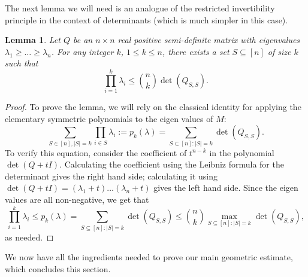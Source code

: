 \documentclass[12pt]{article}
\newtheorem{lemma}{Lemma}
\begin{document}
The next lemma we will need is an analogue of the restricted invertibility
principle in the context of determinants (which is much simpler in this case).

\begin{lemma}\label{lm:rip-det}
  Let $Q$ be an $n\times n$ real positive semi-definite matrix with
  eigenvalues $\lambda_1 \ge \ldots \ge \lambda_n$. For any integer
  $k$, $1 \le k \le n$, there exists a set $S \subseteq [n]$ of size $k$
  such that
  \[\prod_{i=1}^k \lambda_i \leq \binom{n}{k} \det(Q_{S,S}).\]
\end{lemma}
\begin{proof}
To prove the lemma, we will rely on the classical identity for applying the
elementary symmetric polynomials to the eigen values of $M$:
\begin{equation*}
\sum_{S \in [n],|S|=k} \prod_{i \in S} \lambda_i := p_k(\lambda) = \sum_{S \subset [n]: |S| = k}\det(Q_{S,S}).
\end{equation*}
To verify this equation, consider the coefficient of $t^{n-k}$ in the polynomial
$\det(Q + tI)$. Calculating the coefficient using the Leibniz formula for the
determinant gives the right hand side; calculating it using $\det(Q + tI) =
(\lambda_1 + t)\ldots(\lambda_n + t)$ gives the left hand side. Since the eigen
values are all non-negative, we get that
\[
\prod_{i=1}^k \lambda_i \leq p_k(\lambda) =  
 \sum_{S \subseteq [n]: |S|=k} \det(Q_{S,S}) \leq \binom{n}{k} \max_{S
\subseteq [n]: |S|=k} \det(Q_{S,S}),
\]
as needed.
\end{proof}

We now have all the ingredients needed to prove our main geometric estimate,
which concludes this section.
\end{document}

